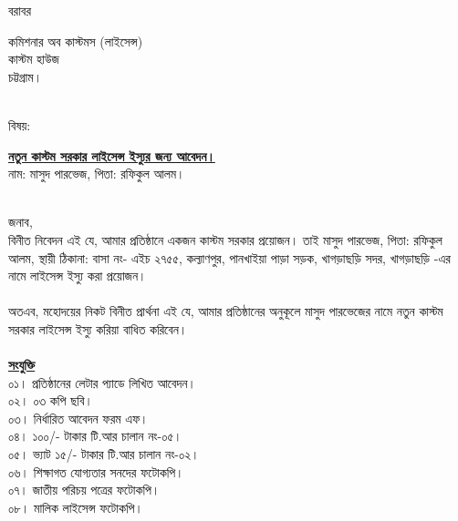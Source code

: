 \documentclass[12pt]{article}
\begin{document}
\noindent
বরাবর
\\
\begin{minipage}[t]{0.06\linewidth}
\hspace{1em}
\end{minipage}
\begin{minipage}[t]{0.94\linewidth}
কমিশনার অব কাস্টমস (লাইসেন্স)
\\
কাস্টম হাউজ
\\
চট্টগ্রাম।
\\
\\
\end{minipage}
\begin{minipage}[t]{0.06\linewidth}
বিষয়:
\end{minipage}
\begin{minipage}[t]{0.94\linewidth}
\textbf{\underline{নতুন কাস্টম সরকার লাইসেন্স ইস্যুর জন্য আবেদন।}}
\\
নাম: মাসুদ পারভেজ, পিতা: রফিকুল আলম।
\\
\\
\end{minipage}
জনাব,
\\
\hspace*{2.7em}বিনীত নিবেদন এই যে,
আমার প্রতিষ্ঠানে একজন কাস্টম সরকার প্রয়োজন।
তাই মাসুদ পারভেজ, পিতা: রফিকুল আলম,
স্থায়ী ঠিকানা: বাসা নং- এইচ ২৭৫৫,
কল্যাণপুর, পানখাইয়া পাড়া সড়ক,
খাগড়াছড়ি সদর, খাগড়াছড়ি -এর নামে
লাইসেন্স ইস্যু করা প্রয়োজন।
\\
\\
অতএব, মহোদয়ের নিকট বিনীত প্রার্থনা এই যে,
আমার প্রতিষ্ঠানের অনুকূলে মাসুদ পারভেজের নামে
নতুন কাস্টম সরকার লাইসেন্স ইস্যু করিয়া
বাধিত করিবেন।
\\
\\
\textbf{\underline{সংযুক্তি}}
\\
০১।  প্রতিষ্ঠানের লেটার প্যাডে লিখিত আবেদন।
\\
০২। ০৩ কপি ছবি।
\\
০৩। নির্ধারিত আবেদন ফরম এফ।
\\
০৪। ১০০/- টাকার টি.আর চালান নং-০৫।
\\
০৫। ভ্যাট ১৫/- টাকার টি.আর চালান নং-০২।
\\
০৬। শিক্ষাগত যোগ্যতার সনদের ফটোকপি।
\\
০৭। জাতীয় পরিচয় পত্রের ফটোকপি।
\\
০৮। মালিক লাইসেন্স ফটোকপি।

\thispagestyle{laststyle}
\end{document}
